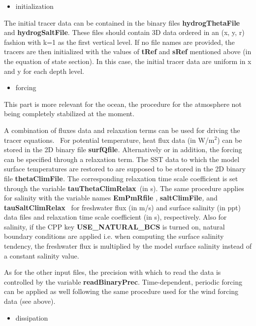 \begin{itemize}
\item initialization
\end{itemize}

The initial tracer data can be contained in the binary files \textbf{%
hydrogThetaFile }and \textbf{hydrogSaltFile}. These files should contain 3D
data ordered in an (x, y, r) fashion with k=1 as the first vertical level.
If no file names are provided, the tracers are then initialized with the
values of \textbf{tRef }and \textbf{sRef }mentioned above (in the equation
of state section). In this case, the initial tracer data are uniform in x
and y for each depth level.

\begin{itemize} 
\item forcing
\end{itemize}

This part is more relevant for the ocean, the procedure for the atmosphere
not being completely stabilized at the moment.

A combination of fluxes data and relaxation terms can be used for driving
the tracer equations. \ For potential temperature, heat flux data (in W/m$%
^{2}$) can be stored in the 2D binary file \textbf{surfQfile}\textit{. }%
Alternatively or in addition, the forcing can be specified through a
relaxation term. The SST data to which the model surface temperatures are
restored to are supposed to be stored in the 2D binary file \textbf{%
thetaClimFile}\textit{. }The corresponding relaxation time scale coefficient
is set through the variable \textbf{tauThetaClimRelax}\textit{\ }(in s). The
same procedure applies for salinity with the variable names \textbf{EmPmRfile%
}\textit{, }\textbf{saltClimFile}\textit{, }and \textbf{tauSaltClimRelax}%
\textit{\ }for freshwater flux (in m/s) and surface salinity (in ppt) data
files and relaxation time scale coefficient (in s), respectively. Also for
salinity, if the CPP key \textbf{USE\_NATURAL\_BCS} is turned on, natural
boundary conditions are applied i.e. when computing the surface salinity
tendency, the freshwater flux is multiplied by the model surface salinity
instead of a constant salinity value.

As for the other input files, the precision with which to read the data is
controlled by the variable \textbf{readBinaryPrec}. Time-dependent, periodic
forcing can be applied as well following the same procedure used for the
wind forcing data (see above).

\begin{itemize}
\item dissipation
\end{itemize}


